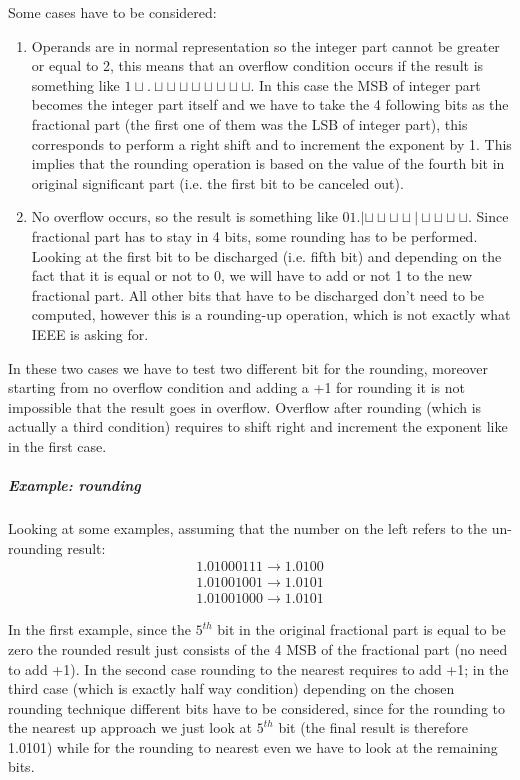 Some cases have to be considered:
\begin{enumerate}
\item Operands are in normal representation so the integer part cannot be
greater or equal to 2, this means that an overflow condition occurs if the
result is something like $1\sqcup.\sqcup \sqcup \sqcup \sqcup \sqcup \sqcup
\sqcup \sqcup$. In this case the MSB of integer part becomes the integer part
itself and we have to take the 4 following bits as the fractional part (the
first one of them was the LSB of integer part), this corresponds to perform a
right shift and to increment the exponent by 1. This implies that the rounding
operation is based on the value of the fourth bit in original significant part
(i.e. the first bit to be canceled out).

\item No overflow occurs, so the result is something like $0 1.|\sqcup \sqcup \sqcup \sqcup| \sqcup \sqcup \sqcup \sqcup$. Since fractional part has to stay in 4 bits, some rounding has to be performed. Looking at the first bit to be discharged (i.e. fifth bit) and depending on the fact that it is equal or not to 0, we will have to add or not 1 to the new fractional part. All other bits that have to be discharged don't need to be computed, however this is a rounding-up operation, which is not exactly what IEEE is asking for.
\end{enumerate}

In these two cases we have to test two different bit for the rounding, moreover starting from no overflow condition and adding a +1 for rounding it is not impossible that the result goes in overflow. Overflow after rounding (which is actually a third condition) requires to shift right and increment the exponent like in the first case.

\subparagraph{Example: rounding}

Looking at some examples, assuming that the number on the left refers to the un-rounding result:
\begin{eqnarray*}
1.0100 0111 \rightarrow 1.0100\\
1.0100 1001 \rightarrow 1.0101\\
1.0100 1000 \rightarrow 1.0101
\end{eqnarray*}

In the first example, since the $5^{th}$ bit in the original fractional part is equal to be zero the rounded result just consists of the 4 MSB of the fractional part (no need to add +1). In the second case rounding to the nearest requires to add +1; in the third case (which is exactly half way condition) depending on the chosen rounding technique different bits have to be considered, since for the rounding to the nearest up approach we just look at $5^{th}$ bit (the final result is therefore 1.0101) while for the rounding to nearest even we have to look at the remaining bits.

